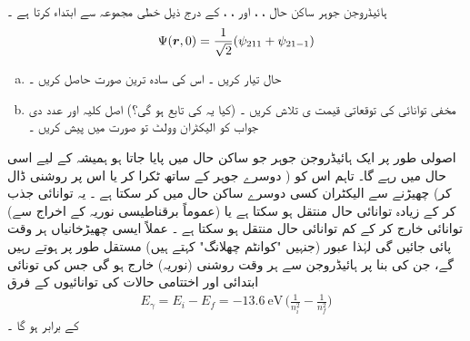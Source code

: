 ہائیڈروجن  جوہر ساکن  حال ، ،   اور  ، ،   کے درج ذیل خطی  مجموعہ   سے ابتداء کرتا ہے ۔
\begin{align*}
\Psi({{\boldsymbol{r}}},0)=\frac{1}{\sqrt{2}}(\psi_{211}+\psi_{21-1})
\end{align*}
\begin{enumerate}[a.]
\item
حال  تیار کریں ۔ اس کی سادہ ترین صورت حاصل کریں ۔
\item
مخفی توانائی  کی توقعاتی قیمت ی    تلاش کریں ۔ (کیا یہ   کی  تابع ہو گی؟)  اصل کلیہ اور عدد دی جواب   کو الیکٹران وولٹ تو صورت میں پیش کریں ۔
\end{enumerate}

اصولی طور پر ایک ہائیڈروجن جوہر جو ساکن حال  میں پایا جاتا ہو  ہمیشہ کے لیے اسی حال میں رہے گا۔ تاہم اس کو (  دوسرے جوہر کے ساتھ ٹکرا کر  یا اس پر روشنی  ڈال کر)  چھیڑنے سے الیکٹران کسی دوسرے ساکن حال میں  کر سکتا ہے ۔ یہ توانائی جذب کر کے زیادہ توانائی  حال منتقل ہو سکتا ہے یا   (عموماً   برقناطیسی   نوریہ کے  اخراج   سے)     توانائی خارج کر  کے کم توانائی  حال  منتقل ہو سکتا ہے ۔ عملاً  ایسی چھیڑخانیاں  ہر وقت پائی جائیں گی لہٰذا عبور (جنہیں  "کوانٹم  چھلانگ" کہتے ہیں)   مستقل طور پر ہوتے  رہیں    گے، جن  کی  بنا پر  ہائیڈروجن  سے ہر وقت   روشنی (نوریہ)  خارج ہو گی جس کی تونائی   ابتدائی اور اختتامی حالات کی  توانائیوں  کے فرق
\begin{align}
E_{\gamma}=E_{i}-E_{f}=\SI{-13.6}{\electronvolt}\,\big(\frac{1}{n^{2}_{i}}-\frac{1}{n^{2}_{f}}\big)
\end{align}
 کے برابر ہو گا ۔
 

